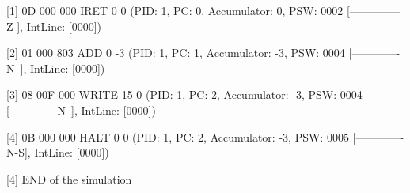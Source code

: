 [\textcolor{termred}{1}] 
{0D 000 000}
 IRET 0 0 (PID: \textcolor{termgreen}{1}, PC: \textcolor{termred}{0}, Accumulator: \textcolor{termred}{0}, PSW: \textcolor{termred}{0002} [\textcolor{termred}{--------------Z-}], IntLine: [\textcolor{termred}{0000}])

[2] 
{01 000 803}
 ADD 0 -3 (PID: \textcolor{termgreen}{1}, PC: \textcolor{termred}{1}, Accumulator: \textcolor{termred}{-3}, PSW: \textcolor{termred}{0004} [\textcolor{termred}{-------------N--}], IntLine: [\textcolor{termred}{0000}])

[3] 
{08 00F 000}
 WRITE 15 0 (PID: \textcolor{termgreen}{1}, PC: \textcolor{termred}{2}, Accumulator: \textcolor{termred}{-3}, PSW: \textcolor{termred}{0004} [\textcolor{termred}{-------------N--}], IntLine: [\textcolor{termred}{0000}])

[4] 
{0B 000 000}
 HALT 0 0 (PID: \textcolor{termgreen}{1}, PC: \textcolor{termred}{2}, Accumulator: \textcolor{termred}{-3}, PSW: \textcolor{termred}{0005} [\textcolor{termred}{-------------N-S}], IntLine: [\textcolor{termred}{0000}])

[4] 
\textcolor{termred}{END of the simulation
}
